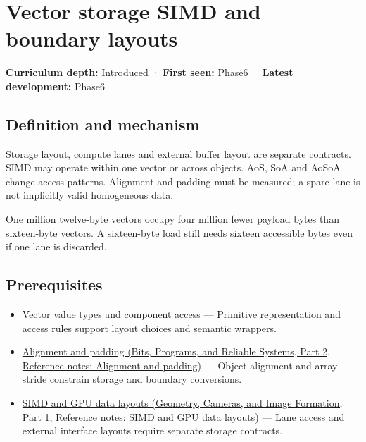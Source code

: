 \hypertarget{appendix-26bf6bf2fb8b}{}\label{referencestart:appendix-26bf6bf2fb8b}
\section{Vector storage SIMD and boundary layouts}\label{appendix-26bf6bf2fb8b-vector-storage-simd-and-boundary-layouts}

\hypertarget{appendix-26bf6bf2fb8b-vector-storage-simd-and-boundary-layouts}{}

\textbf{Curriculum depth:} Introduced · \textbf{First seen:} Phase6 · \textbf{Latest development:} Phase6

\begin{allmightroledefinition}

\subsection{Definition and mechanism}\label{appendix-26bf6bf2fb8b-definition-and-mechanism}

\hypertarget{appendix-26bf6bf2fb8b-definition-and-mechanism}{}

Storage layout, compute lanes and external buffer layout are separate contracts. SIMD may operate within one vector or across objects. AoS, SoA and AoSoA change access patterns. Alignment and padding must be measured; a spare lane is not implicitly valid homogeneous data.

\end{allmightroledefinition}

One million twelve-byte vectors occupy four million fewer payload bytes than sixteen-byte vectors. A sixteen-byte load still needs sixteen accessible bytes even if one lane is discarded.

\subsection{Prerequisites}\label{appendix-26bf6bf2fb8b-prerequisites}

\hypertarget{appendix-26bf6bf2fb8b-prerequisites}{}

\begin{itemize}
\tightlist
\item
  \hyperref[appendix-37a39984ba66]{Vector value types and component access} --- Primitive representation and access rules support layout choices and semantic wrappers.
\item
  \href{../01-Bits-Programs-and-Reliable-Systems-P02/main.pdf\#appendix-a1f7c53b4742}{Alignment and padding (Bits, Programs, and Reliable Systems, Part 2, Reference notes: Alignment and padding)} --- Object alignment and array stride constrain storage and boundary conversions.
\item
  \href{../03-Geometry-Cameras-and-Image-Formation-P01/main.pdf\#appendix-3c7b1a56de01}{SIMD and GPU data layouts (Geometry, Cameras, and Image Formation, Part 1, Reference notes: SIMD and GPU data layouts)} --- Lane access and external interface layouts require separate storage contracts.
\end{itemize}

